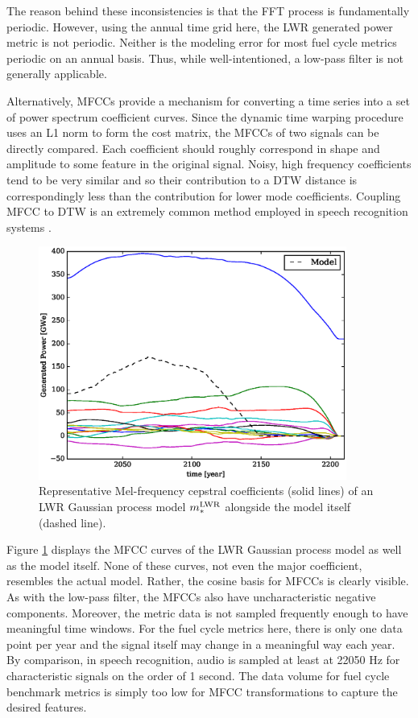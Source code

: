 The reason behind these inconsistencies is that the FFT process is fundamentally 
periodic.  However, using the annual time grid here, the LWR generated power metric
is not periodic. Neither is the modeling error for most fuel cycle metrics periodic
on an annual basis. 
Thus, while well-intentioned, a low-pass filter is not generally applicable.

Alternatively, MFCCs provide a mechanism for converting a time series into a 
set of power spectrum coefficient curves. Since the dynamic time warping procedure
uses an L1 norm to form the cost matrix, the MFCCs of two signals can be directly 
compared. Each coefficient should roughly correspond in shape and amplitude to some
feature in the original signal.  Noisy, high frequency coefficients tend to be 
very similar and so their contribution to a DTW distance is correspondingly less 
than the contribution for lower mode coefficients. Coupling MFCC to DTW is an 
extremely common method employed in speech recognition systems 
\cite{muda2010voice,milner2002speech,sato2007emotion}.  

\begin{figure}[htb]
\centering
\includegraphics[width=0.9\textwidth]{mfcc-lwr-model.eps}
\caption{Representative Mel-frequency cepstral coefficients (solid lines) of an 
LWR Gaussian process model $m_*^{\mathrm{LWR}}$ alongside the model itself (dashed line).}
\label{mfcc-lwr-model}
\end{figure}

Figure \ref{mfcc-lwr-model} displays the MFCC curves of the LWR Gaussian 
process model as well as the model itself. None of these curves, not even the major 
coefficient, resembles the actual model.  Rather, the cosine basis for MFCCs
is clearly visible.  As with the low-pass filter, the MFCCs also have 
uncharacteristic negative components.  Moreover, 
the metric data is not sampled frequently enough to have meaningful
time windows. For the fuel cycle metrics here, there is only one data point per year 
and the signal itself may change in a meaningful way each year. By comparison, 
in speech recognition, audio is sampled at least at 22050 Hz for characteristic 
signals on the order of 1 second.  The data volume for fuel cycle benchmark metrics
is simply too low for MFCC transformations to capture the desired features. 

